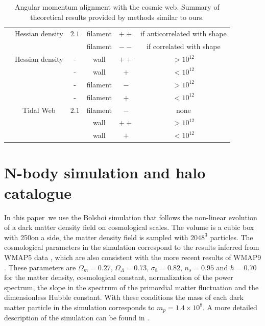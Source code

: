 \documentclass[useAMS,usenatbib]{mn2e}
\newcommand{\documentname}{paper~}
\newcommand{\hMpc}{{\ifmmode{h^{-1}{\rm Mpc}}\else{$h^{-1}$Mpc }\fi}}
\newcommand{\hMsun}{{\ifmmode{h^{-1}{\rm
        {M_{\odot}}}}\else{$h^{-1}{\rm{M_{\odot}}}$~}\fi}}
\begin{document}
\begin{table}
\begin{tabular}{cccccc}
\cite{Zhang2009}  & Hessian density &  $2.1$ &
filament & $++$ & if anticorrelated with shape\\

& &  &
filament & $--$ & if correlated with shape\\\hline

\cite{AragonCalvo2007} & Hessian density & - &
wall & $++$ & $>10^{12}$\hMsun\\


& & - &
wall & $+$ & $<10^{12}$\hMsun\\

& & - &
filament& $-$ & $>10^{12}$\hMsun\\


& & - &
filament& $+$ & $<10^{12}$\hMsun\\\hline



\cite{Hahn2007} & Tidal Web & $2.1$ & filament & $-$& none\\

& & &
wall & $++$ & $>10^{12}$\hMsun\\
& &    &
wall& $+$ & $<10^{12}$\hMsun\\\hline \hline


\end{tabular}
\caption{Angular momentum alignment with the cosmic web. Summary of theoretical
  results provided by methods similar to ours.}

\end{table}



\section{N-body simulation and halo catalogue}
\label{sec:nbody}

In this \documentname we use the Bolshoi simulation that follows the
non-linear evolution of a dark matter density field on cosmological
scales. The volume is a cubic box with 250\hMpc on a side, the matter
density field is sampled with $2048^3$ particles. The 
cosmological parameters in the simulation correspond to the results
inferred from WMAP5 data \citep{2009ApJS..180..306D}, which are also consistent with the more
recent results of WMAP9 \citep{2013ApJS..208...19H}. These parameters are $\Omega_m=0.27$,
$\Omega_{\Lambda} =0.73$, $\sigma_8=0.82$, $n_s=0.95$ and $h=0.70$ for the
matter density, cosmological constant, normalization of the power
spectrum, the slope in the spectrum of the primordial matter
fluctuation and the dimensionless Hubble constant. With these
conditions the mass of each dark matter particle in the simulation
corresponds to $m_p=1.4\times 10^{8}$\hMsun. A more detailed
description of the simulation can be found in
\citep{2011ApJ...740..102K}.
\end{document}
